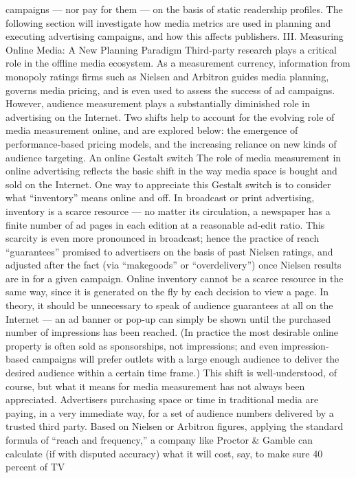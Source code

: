 campaigns — nor pay for them — on the basis of static readership
profiles. The following section will investigate how media metrics are
used in planning and executing advertising campaigns, and how this
affects publishers.
III. Measuring Online Media: A New Planning Paradigm
Third‐party research plays a critical role in the offline media ecosystem.
As a measurement currency, information from monopoly ratings firms
such as Nielsen and Arbitron guides media planning, governs media
pricing, and is even used to assess the success of ad campaigns. However,
audience measurement plays a substantially diminished role in
advertising on the Internet. Two shifts help to account for the evolving
role of media measurement online, and are explored below: the
emergence of performance‐based pricing models, and the increasing
reliance on new kinds of audience targeting.
An online Gestalt switch
The role of media measurement in online advertising reflects the basic
shift in the way media space is bought and sold on the Internet. One way
to appreciate this Gestalt switch is to consider what ``inventory'' means
online and off. In broadcast or print advertising, inventory is a scarce
resource — no matter its circulation, a newspaper has a finite number of
ad pages in each edition at a reasonable ad‐edit ratio. This scarcity is even
more pronounced in broadcast; hence the practice of reach ``guarantees''
promised to advertisers on the basis of past Nielsen ratings, and adjusted
after the fact (via ``makegoods'' or ``overdelivery'') once Nielsen results are
in for a given campaign.
Online inventory cannot be a scarce resource in the same way, since it is
generated on the fly by each decision to view a page. In theory, it should
be unnecessary to speak of audience guarantees at all on the Internet — an
ad banner or pop‐up can simply be shown until the purchased number of
impressions has been reached. (In practice the most desirable online
property is often sold as sponsorships, not impressions; and even
impression‐based campaigns will prefer outlets with a large enough
audience to deliver the desired audience within a certain time frame.)
This shift is well‐understood, of course, but what it means for media
measurement has not always been appreciated. Advertisers purchasing
space or time in traditional media are paying, in a very immediate way,
for a set of audience numbers delivered by a trusted third party. Based on
Nielsen or Arbitron figures, applying the standard formula of ``reach and
frequency,'' a company like Proctor & Gamble can calculate (if with
disputed accuracy) what it will cost, say, to make sure 40 percent of TV

